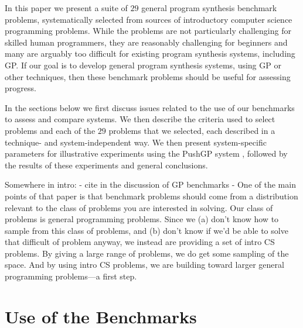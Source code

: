 \documentclass{sig-alternate}
\begin{document}
In this paper we present a suite of $29$ general program synthesis benchmark problems, systematically selected from sources of introductory computer science programming problems. While the problems are not particularly challenging for skilled human programmers, they are reasonably challenging for beginners and many are arguably too difficult for existing program synthesis systems, including GP. If our goal is to develop general program synthesis systems, using GP or other techniques, then these benchmark problems should be useful for assessing progress.

In the sections below we first discuss issues related to the use of our benchmarks to assess and compare systems. We then describe the criteria used to select problems and each of the $29$ problems that we selected, each described in a technique- and system-independent way. We then present system-specific parameters for illustrative experiments using the PushGP system \cite{spector:2002:GPEM, 1068292}, followed by the results of these experiments and general conclusions.


Somewhere in intro:
- cite \cite{Woodward:2014:GECCOcomp} in the discussion of GP benchmarks
- One of the main points of that paper is that benchmark problems should come from a distribution relevant to the class of problems you are interested in solving. Our class of problems is general programming problems. Since we (a) don't know how to sample from this class of problems, and (b) don't know if we'd be able to solve that difficult of problem anyway, we instead are providing a set of intro CS problems. By giving a large range of problems, we do get some sampling of the space. And by using intro CS problems, we are building toward larger general programming problems---a first step.


\section{Use of the Benchmarks}
\end{document}
